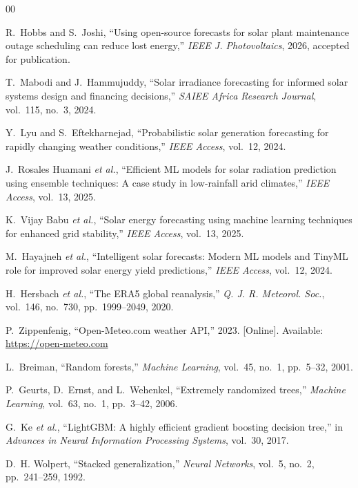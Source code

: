 \documentclass[conference]{IEEEtran}
\begin{document}
\balance
\begin{thebibliography}{00}

 R.~Hobbs and S.~Joshi, ``Using open-source forecasts for
solar plant maintenance outage scheduling can reduce lost energy,''
\emph{IEEE J. Photovoltaics}, 2026, accepted for publication.

 T.~Mabodi and J.~Hammujuddy, ``Solar irradiance
forecasting for informed solar systems design and financing
decisions,'' \emph{SAIEE Africa Research Journal}, vol.~115, no.~3,
2024.

 Y.~Lyu and S.~Eftekharnejad, ``Probabilistic solar
generation forecasting for rapidly changing weather conditions,''
\emph{IEEE Access}, vol.~12, 2024.

 J.~Rosales Huamani \emph{et al.}, ``Efficient ML models
for solar radiation prediction using ensemble techniques: A case study
in low-rainfall arid climates,'' \emph{IEEE Access}, vol.~13, 2025.

 K.~Vijay Babu \emph{et al.}, ``Solar energy forecasting
using machine learning techniques for enhanced grid stability,''
\emph{IEEE Access}, vol.~13, 2025.

 M.~Hayajneh \emph{et al.}, ``Intelligent solar forecasts:
Modern ML models and TinyML role for improved solar energy yield
predictions,'' \emph{IEEE Access}, vol.~12, 2024.

 H.~Hersbach \emph{et al.}, ``The ERA5 global
reanalysis,'' \emph{Q. J. R. Meteorol. Soc.}, vol.~146, no.~730,
pp.~1999--2049, 2020.

 P.~Zippenfenig, ``Open-Meteo.com weather API,''
2023. [Online]. Available: \url{https://open-meteo.com}

 L.~Breiman, ``Random forests,'' \emph{Machine
Learning}, vol.~45, no.~1, pp.~5--32, 2001.

 P.~Geurts, D.~Ernst, and L.~Wehenkel,
``Extremely randomized trees,'' \emph{Machine Learning}, vol.~63,
no.~1, pp.~3--42, 2006.

 G.~Ke \emph{et al.}, ``LightGBM: A highly efficient
gradient boosting decision tree,'' in \emph{Advances in Neural
Information Processing Systems}, vol.~30, 2017.

 D.~H. Wolpert, ``Stacked generalization,''
\emph{Neural Networks}, vol.~5, no.~2, pp.~241--259, 1992.


\end{thebibliography}
\end{document}
